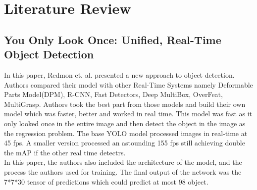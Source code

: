 \chapter{Literature Review}
    \section{You Only Look Once: Unified, Real-Time Object Detection }
        In this paper\cite{redmon2016you}, Redmon et. al. presented a new approach to object detection. Authors compared their model with other Real-Time Systems namely Deformable Parts Model(DPM), R-CNN, Fast Detectors, Deep MultiBox, OverFeat, MultiGrasp. Authors took the best part from those models and build their own model which was faster, better and worked in real time. This model was fast as it only looked once in the entire image and then detect the object in the image as the regression problem. The base YOLO model processed images in real-time at 45 fps. A smaller version processed an astounding 155 fps still achieving double the mAP if the other real time detectrs.\\
        In this paper, the authors also included the architecture of the model, and the process the authors used for training. The final output of the network was the 7*7*30 tensor of predictions which could predict at most 98 object.

